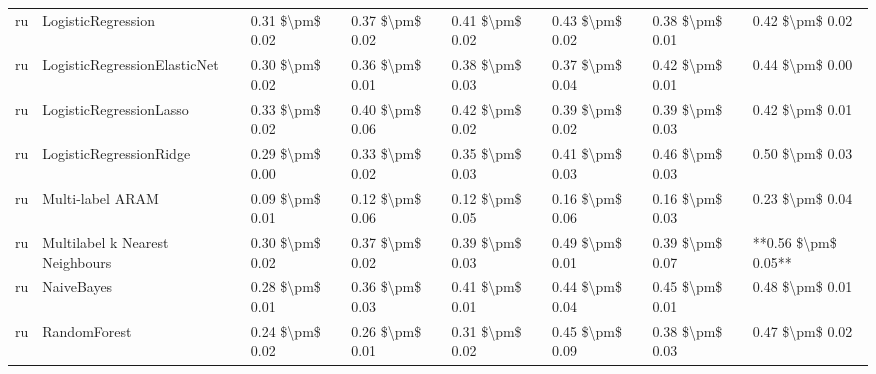 \begin{tabular}{llllllll}
      ru &              LogisticRegression & 0.31 \$\textbackslash pm\$ 0.02 &           0.37 \$\textbackslash pm\$ 0.02 &       0.41 \$\textbackslash pm\$ 0.02 &        0.43 \$\textbackslash pm\$ 0.02 &                         0.38 \$\textbackslash pm\$ 0.01 &     0.42 \$\textbackslash pm\$ 0.02 \\
      ru &    LogisticRegressionElasticNet & 0.30 \$\textbackslash pm\$ 0.02 &           0.36 \$\textbackslash pm\$ 0.01 &       0.38 \$\textbackslash pm\$ 0.03 &        0.37 \$\textbackslash pm\$ 0.04 &                         0.42 \$\textbackslash pm\$ 0.01 &     0.44 \$\textbackslash pm\$ 0.00 \\
      ru &         LogisticRegressionLasso & 0.33 \$\textbackslash pm\$ 0.02 &           0.40 \$\textbackslash pm\$ 0.06 &       0.42 \$\textbackslash pm\$ 0.02 &        0.39 \$\textbackslash pm\$ 0.02 &                         0.39 \$\textbackslash pm\$ 0.03 &     0.42 \$\textbackslash pm\$ 0.01 \\
      ru &         LogisticRegressionRidge & 0.29 \$\textbackslash pm\$ 0.00 &           0.33 \$\textbackslash pm\$ 0.02 &       0.35 \$\textbackslash pm\$ 0.03 &        0.41 \$\textbackslash pm\$ 0.03 &                         0.46 \$\textbackslash pm\$ 0.03 &     0.50 \$\textbackslash pm\$ 0.03 \\
      ru &                Multi-label ARAM & 0.09 \$\textbackslash pm\$ 0.01 &           0.12 \$\textbackslash pm\$ 0.06 &       0.12 \$\textbackslash pm\$ 0.05 &        0.16 \$\textbackslash pm\$ 0.06 &                         0.16 \$\textbackslash pm\$ 0.03 &     0.23 \$\textbackslash pm\$ 0.04 \\
      ru & Multilabel k Nearest Neighbours & 0.30 \$\textbackslash pm\$ 0.02 &           0.37 \$\textbackslash pm\$ 0.02 &       0.39 \$\textbackslash pm\$ 0.03 &        0.49 \$\textbackslash pm\$ 0.01 &                         0.39 \$\textbackslash pm\$ 0.07 & **0.56 \$\textbackslash pm\$ 0.05** \\
      ru &                      NaiveBayes & 0.28 \$\textbackslash pm\$ 0.01 &           0.36 \$\textbackslash pm\$ 0.03 &       0.41 \$\textbackslash pm\$ 0.01 &        0.44 \$\textbackslash pm\$ 0.04 &                         0.45 \$\textbackslash pm\$ 0.01 &     0.48 \$\textbackslash pm\$ 0.01 \\
      ru &                    RandomForest & 0.24 \$\textbackslash pm\$ 0.02 &           0.26 \$\textbackslash pm\$ 0.01 &       0.31 \$\textbackslash pm\$ 0.02 &        0.45 \$\textbackslash pm\$ 0.09 &                         0.38 \$\textbackslash pm\$ 0.03 &     0.47 \$\textbackslash pm\$ 0.02 \\

\end{tabular}
